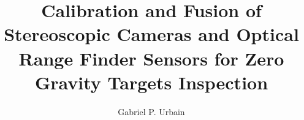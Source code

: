 % 
% 
%
%
%
%
%
%
%
% 
% 

\title{Calibration and Fusion of Stereoscopic Cameras and Optical Range Finder Sensors for Zero Gravity Targets Inspection}

\author{Gabriel P. Urbain}


